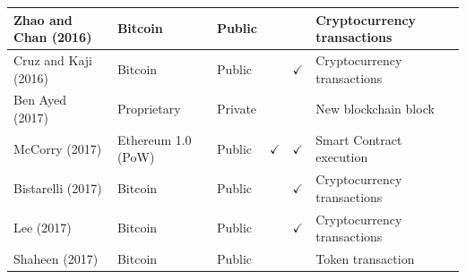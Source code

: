 \documentclass[../access.tex]{subfiles}
\begin{document}
\begin{table}[htbp]
\begin{adjustwidth}{-2cm}{}
\begin{tabular}{m{4.4cm} >{\centering\arraybackslash}m{2.9cm} >{\centering\arraybackslash}m{1.0cm} >{\centering\arraybackslash}m{1.0cm} >{\centering\arraybackslash}m{1.5cm} >{\centering\arraybackslash}m{3.6cm}}
            \footnotesize{Zhao and Chan (2016) \cite{Zhao2016}}                 & \footnotesize{Bitcoin}                         & \footnotesize{Public}                            & {}                                                     & {}                                                    & \footnotesize{Cryptocurrency transactions} \\
            \hline
            \footnotesize{Cruz and Kaji (2016) \cite{Cruz2016}}                 & \footnotesize{Bitcoin}                         & \footnotesize{Public}                            & {}                                                     & $ \checkmark $                                        & \footnotesize{Cryptocurrency transactions} \\
            \hline
            \footnotesize{Ben Ayed (2017) \cite{BenAyed2017}}                   & \footnotesize{Proprietary}                     & \footnotesize{Private}                           & {}                                                     & {}                                                    & \footnotesize{New blockchain block}        \\
            \hline
            \footnotesize{McCorry (2017) \cite{McCorry2017}}                    & \footnotesize{Ethereum 1.0 (PoW)}              & \footnotesize{Public}                            & $ \checkmark $                                         & $ \checkmark $                                        & \footnotesize{Smart Contract execution}    \\
            \hline
            \footnotesize{Bistarelli (2017) \cite{Bistarelli2017}}              & \footnotesize{Bitcoin}                         & \footnotesize{Public}                            & {}                                                     & $ \checkmark $                                        & \footnotesize{Cryptocurrency transactions} \\
            \hline
            \footnotesize{Lee (2017) \cite{Lee2017}}                            & \footnotesize{Bitcoin}                         & \footnotesize{Public}                            & {}                                                     & $ \checkmark $                                        & \footnotesize{Cryptocurrency transactions} \\
            \hline
            \footnotesize{Shaheen (2017) \cite{Shaheen2017}}                    & \footnotesize{Bitcoin}                         & \footnotesize{Public}                            & {}                                                     & {}                                                    & \footnotesize{Token transaction}           \\

\end{tabular}
\end{adjustwidth}
\end{table}
\end{document}
